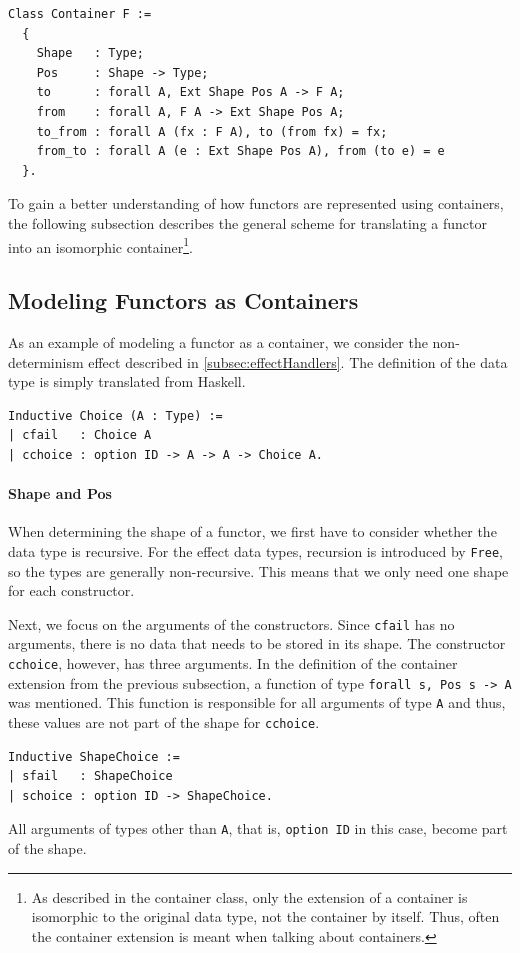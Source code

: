 \documentclass[a4paper, 11pt, fleqn, twoside, abstract=on]{scrreprt}
\newcommand{\cinl}[1]{\texttt{#1}}
\begin{document}
\begin{verbatim}
Class Container F :=
  {
    Shape   : Type;
    Pos     : Shape -> Type;
    to      : forall A, Ext Shape Pos A -> F A;
    from    : forall A, F A -> Ext Shape Pos A;
    to_from : forall A (fx : F A), to (from fx) = fx;
    from_to : forall A (e : Ext Shape Pos A), from (to e) = e
  }.
\end{verbatim}

To gain a better understanding of how functors are represented using containers, the following subsection describes the general scheme for translating a functor into an isomorphic container\footnote{As described in the container class, only the extension of a container is isomorphic to the original data type, not the container by itself. Thus, often the container extension is meant when talking about containers.}.

\subsection{Modeling Functors as Containers}
As an example of modeling a functor as a container, we consider the non-determinism effect described in \autoref{subsec:effectHandlers}.
The definition of the data type is simply translated from Haskell.

\begin{verbatim}
Inductive Choice (A : Type) :=
| cfail   : Choice A
| cchoice : option ID -> A -> A -> Choice A.
\end{verbatim}

\paragraph{Shape and Pos}
When determining the shape of a functor, we first have to consider whether the data type is recursive.
For the effect data types, recursion is introduced by \cinl{Free}, so the types are generally non-recursive.
This means that we only need one shape for each constructor.

Next, we focus on the arguments of the constructors.
Since \cinl{cfail} has no arguments, there is no data that needs to be stored in its shape.
The constructor \cinl{cchoice}, however, has three arguments.
In the definition of the container extension from the previous subsection, a function of type \cinl{forall s, Pos s -> A} was mentioned.
This function is responsible for all arguments of type \cinl{A} and thus, these values are not part of the shape for \cinl{cchoice}.
\pagebreak
\begin{verbatim}
Inductive ShapeChoice :=
| sfail   : ShapeChoice
| schoice : option ID -> ShapeChoice.
\end{verbatim}
\noindent
All arguments of types other than \cinl{A}, that is, \cinl{option ID} in this case, become part of the shape.
\end{document}
